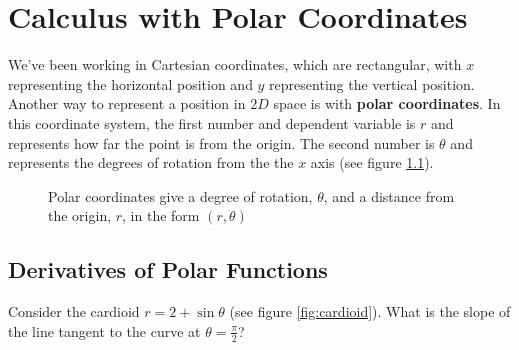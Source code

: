 \chapter{Calculus with Polar Coordinates}

We've been working in Cartesian coordinates, which are rectangular, with $x$ 
representing the horizontal position and $y$ representing the vertical 
position. Another way to represent a position in $2D$ space is with \textbf{
polar coordinates}. In this coordinate system, the 
first number and dependent variable is $r$ and represents how 
far the point is from the origin. The second number is $\theta$ and represents the degrees 
of rotation from the the $x$ axis (see figure \ref{fig:polarex}). 

\begin{figure}[htbp]
\centering
    \label{fig:polarex}
    \caption{Polar coordinates give a degree of rotation, $\theta$, and a 
    distance from the origin, $r$, in the form $(r, \theta)$}
    \end{figure}

\section{Derivatives of Polar Functions}
Consider the cardioid $r = 2 + \sin{\theta}$ (see figure \ref{fig:cardioid}). What 
is the slope of the line tangent to the curve at $\theta = \frac{\pi}{2}$? 

